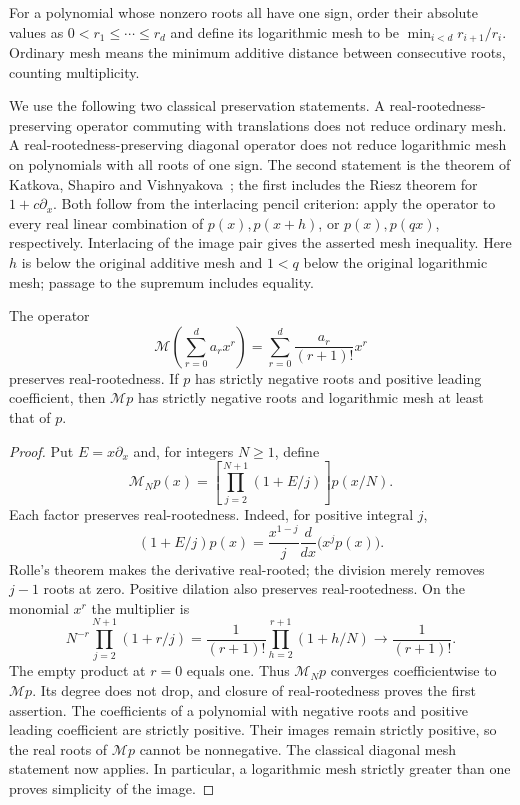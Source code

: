 For a polynomial whose nonzero roots all have one sign, order their
absolute values as $0<r_1\le\cdots\le r_d$ and define its logarithmic
mesh to be $\min_{i<d}r_{i+1}/r_i$. Ordinary mesh means the minimum
additive distance between consecutive roots, counting multiplicity.

We use the following two classical preservation statements. A
real-rootedness-preserving operator commuting with translations does
not reduce ordinary mesh. A real-rootedness-preserving diagonal
operator does not reduce logarithmic mesh on polynomials with all
roots of one sign. The second statement is the theorem of Katkova,
Shapiro and Vishnyakova~\cite{polylerch:KSV}; the first includes the
Riesz theorem for $1+c\partial_x$. Both follow from the interlacing
pencil criterion: apply the operator to every real linear combination
of $p(x),p(x+h)$, or $p(x),p(qx)$, respectively. Interlacing of the
image pair gives the asserted mesh inequality. Here $h$ is below
the original additive mesh and $1<q$ below the original logarithmic
mesh; passage to the supremum includes equality.

\begin{lemma}\label{polylerch:lem:multiplier}
The operator
\[
 \mathcal M\left(\sum_{r=0}^d a_rx^r\right)
   =\sum_{r=0}^d\frac{a_r}{(r+1)!}x^r
\]
preserves real-rootedness. If $p$ has strictly negative roots and positive
leading coefficient, then $\mathcal Mp$ has strictly negative roots
and logarithmic mesh at least that of $p$.
\end{lemma}
\begin{proof}
Put $E=x\partial_x$ and, for integers $N\ge1$, define
\[
 \mathcal M_Np(x)
 =\left[\prod_{j=2}^{N+1}(1+E/j)\right]p(x/N).
\]
Each factor preserves real-rootedness. Indeed, for positive integral $j$,
\[
 (1+E/j)p(x)=\frac{x^{1-j}}j\frac{d}{dx}\bigl(x^jp(x)\bigr).
\]
Rolle's theorem makes the derivative real-rooted; the division merely
removes $j-1$ roots at zero. Positive dilation also preserves
real-rootedness. On the monomial $x^r$ the multiplier is
\[
 N^{-r}\prod_{j=2}^{N+1}(1+r/j)
 =\frac1{(r+1)!}\prod_{h=2}^{r+1}(1+h/N)
 \longrightarrow\frac1{(r+1)!}.
\]
The empty product at $r=0$ equals one. Thus $\mathcal M_Np$ converges
coefficientwise to $\mathcal Mp$. Its degree does not drop, and closure
of real-rootedness proves the first assertion. The coefficients of a
polynomial with negative roots and positive leading coefficient are
strictly positive. Their images remain strictly positive, so the
real roots of $\mathcal Mp$ cannot be nonnegative. The classical
diagonal mesh statement now applies. In particular, a logarithmic
mesh strictly greater than one proves simplicity of the image.
\end{proof}

